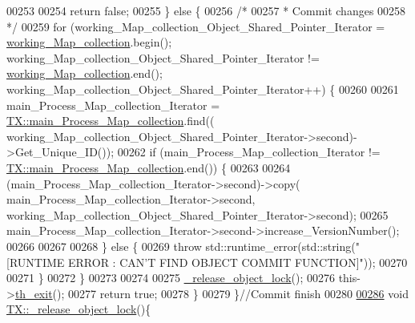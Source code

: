 \begin{DoxyCode}
00253 
00254         \textcolor{keywordflow}{return} \textcolor{keyword}{false};
00255     \} \textcolor{keywordflow}{else} \{
00256         \textcolor{comment}{/*}
00257 \textcolor{comment}{         * Commit changes}
00258 \textcolor{comment}{         */}
00259         \textcolor{keywordflow}{for} (working\_Map\_collection\_Object\_Shared\_Pointer\_Iterator = 
      \hyperlink{class_t_x_a81aafda16e2f20e36ec6c68e584668ff_a81aafda16e2f20e36ec6c68e584668ff}{working\_Map\_collection}.begin(); working\_Map\_collection\_Object\_Shared\_Pointer\_Iterator
       != \hyperlink{class_t_x_a81aafda16e2f20e36ec6c68e584668ff_a81aafda16e2f20e36ec6c68e584668ff}{working\_Map\_collection}.end(); 
      working\_Map\_collection\_Object\_Shared\_Pointer\_Iterator++) \{
00260             
00261                 main\_Process\_Map\_collection\_Iterator = 
      \hyperlink{class_t_x_a1a45d726894190695314464d7cd97c29_a1a45d726894190695314464d7cd97c29}{TX::main\_Process\_Map\_collection}.find((
      working\_Map\_collection\_Object\_Shared\_Pointer\_Iterator->second)->Get\_Unique\_ID());
00262                 \textcolor{keywordflow}{if} (main\_Process\_Map\_collection\_Iterator != 
      \hyperlink{class_t_x_a1a45d726894190695314464d7cd97c29_a1a45d726894190695314464d7cd97c29}{TX::main\_Process\_Map\_collection}.end()) \{
00263 
00264                     (main\_Process\_Map\_collection\_Iterator->second)->copy(
      main\_Process\_Map\_collection\_Iterator->second, working\_Map\_collection\_Object\_Shared\_Pointer\_Iterator->second);
00265                     main\_Process\_Map\_collection\_Iterator->second->increase\_VersionNumber();
00266 
00267 
00268                 \} \textcolor{keywordflow}{else} \{
00269                     \textcolor{keywordflow}{throw} std::runtime\_error(std::string(\textcolor{stringliteral}{"[RUNTIME ERROR : CAN'T FIND OBJECT COMMIT
       FUNCTION]"}));
00270 
00271                 \}
00272         \}
00273 
00274 
00275         \hyperlink{class_t_x_a4c13d2015dc15d0f788fa9a1413f0463_a4c13d2015dc15d0f788fa9a1413f0463}{\_release\_object\_lock}();
00276         this->\hyperlink{class_t_x_ae045534c4a9d39bd5c6ea2a39a372a79_ae045534c4a9d39bd5c6ea2a39a372a79}{th\_exit}();
00277         \textcolor{keywordflow}{return} \textcolor{keyword}{true};
00278     \}
00279 \}\textcolor{comment}{//Commit finish}
00280 
\hypertarget{_t_x_8cpp_source.tex_l00286}{}\hyperlink{class_t_x_a4c13d2015dc15d0f788fa9a1413f0463_a4c13d2015dc15d0f788fa9a1413f0463}{00286} \textcolor{keywordtype}{void} \hyperlink{class_t_x_a4c13d2015dc15d0f788fa9a1413f0463_a4c13d2015dc15d0f788fa9a1413f0463}{TX::\_release\_object\_lock}()\{

\end{DoxyCode}
